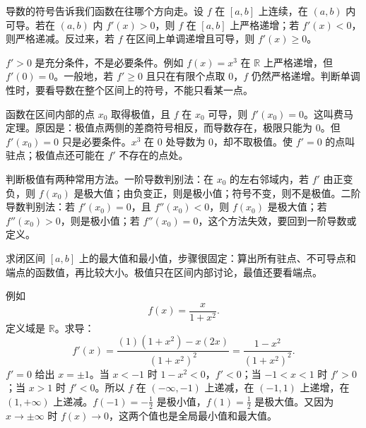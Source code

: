 导数的符号告诉我们函数在往哪个方向走。设 $f$ 在 $[a,b]$ 上连续，在 $(a,b)$ 内可导。若在 $(a,b)$ 内 $f'(x)>0$，则 $f$ 在 $[a,b]$ 上严格递增；若 $f'(x)<0$，则严格递减。反过来，若 $f$ 在区间上单调递增且可导，则 $f'(x)\ge0$。

$f'>0$ 是充分条件，不是必要条件。例如 $f(x)=x^3$ 在 $\mathbb R$ 上严格递增，但 $f'(0)=0$。一般地，若 $f'\ge0$ 且只在有限个点取 $0$，$f$ 仍然严格递增。判断单调性时，要看导数在整个区间上的符号，不能只看某一点。

函数在区间内部的点 $x_0$ 取得极值，且 $f$ 在 $x_0$ 可导，则 $f'(x_0)=0$。这叫费马定理。原因是：极值点两侧的差商符号相反，而导数存在，极限只能为 $0$。但 $f'(x_0)=0$ 只是必要条件。$x^3$ 在 $0$ 处导数为 $0$，却不取极值。使 $f'=0$ 的点叫驻点；极值点还可能在 $f'$ 不存在的点处。

判断极值有两种常用方法。一阶导数判别法：在 $x_0$ 的左右邻域内，若 $f'$ 由正变负，则 $f(x_0)$ 是极大值；由负变正，则是极小值；符号不变，则不是极值。二阶导数判别法：若 $f'(x_0)=0$，且 $f''(x_0)<0$，则 $f(x_0)$ 是极大值；若 $f''(x_0)>0$，则是极小值；若 $f''(x_0)=0$，这个方法失效，要回到一阶导数或定义。

求闭区间 $[a,b]$ 上的最大值和最小值，步骤很固定：算出所有驻点、不可导点和端点的函数值，再比较大小。极值只在区间内部讨论，最值还要看端点。

例如
\[
f(x)=\frac{x}{1+x^2}.
\]
定义域是 $\mathbb R$。求导：
\[
f'(x)=\frac{(1)(1+x^2)-x(2x)}{(1+x^2)^2}
=\frac{1-x^2}{(1+x^2)^2}.
\]
$f'=0$ 给出 $x=\pm1$。当 $x<-1$ 时 $1-x^2<0$，$f'<0$；当 $-1<x<1$ 时 $f'>0$；当 $x>1$ 时 $f'<0$。所以 $f$ 在 $(-\infty,-1)$ 上递减，在 $(-1,1)$ 上递增，在 $(1,+\infty)$ 上递减。$f(-1)=-\frac12$ 是极小值，$f(1)=\frac12$ 是极大值。又因为 $x\to\pm\infty$ 时 $f(x)\to0$，这两个值也是全局最小值和最大值。

